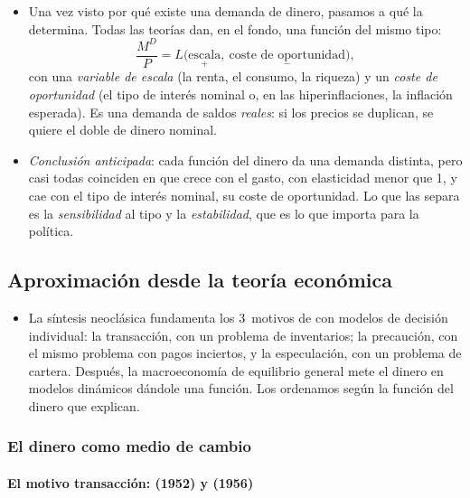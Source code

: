 \documentclass[11pt]{article}
\begin{document}
\begin{itemize}
\item Una vez visto por qué existe una demanda de dinero, pasamos a qué la determina. Todas las teorías dan, en el fondo, una función del mismo tipo:
  \begin{equation}
  \frac{M^D}{P}=L\big(\underset{+}{\text{escala}},\ \underset{-}{\text{coste de oportunidad}}\big), \label{eq:demanda-general}
  \end{equation}
  con una \emph{variable de escala} (la renta, el consumo, la riqueza) y un \emph{coste de oportunidad} (el tipo de interés nominal o, en las hiperinflaciones, la inflación esperada). Es una demanda de saldos \emph{reales}: si los precios se duplican, se quiere el doble de dinero nominal.
\item \emph{Conclusión anticipada}: cada función del dinero da una demanda distinta, pero casi todas coinciden en que crece con el gasto, con elasticidad menor que 1, y cae con el tipo de interés nominal, su coste de oportunidad. Lo que las separa es la \emph{sensibilidad} al tipo y la \emph{estabilidad}, que es lo que importa para la política.
\end{itemize}

\subsection{Aproximación desde la teoría económica}\label{sec:teoria}

\begin{itemize}
\item La síntesis neoclásica fundamenta los 3~motivos de  con modelos de decisión individual: la transacción, con un problema de inventarios; la precaución, con el mismo problema con pagos inciertos, y la especulación, con un problema de cartera. Después, la macroeconomía de equilibrio general mete el dinero en modelos dinámicos dándole una función. Los ordenamos según la función del dinero que explican.
\end{itemize}

\subsubsection{El dinero como medio de cambio}\label{sec:medio-cambio}

\paragraph{El motivo transacción:  (1952) y  (1956)}
\end{document}

